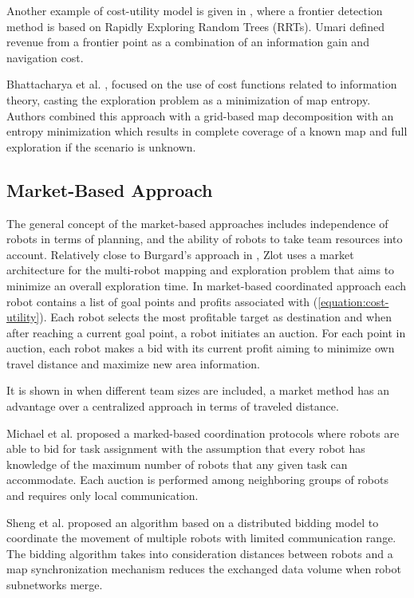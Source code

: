 Another example of cost-utility model is given in \cite{Umari2017}, where a frontier detection method is based on Rapidly Exploring Random Trees (RRTs). Umari defined revenue from a frontier point as a combination of an information gain and navigation cost.
 
Bhattacharya et al. \cite{Bhattacharya2013}, \cite{BhattacharyaGhrist2013} focused on the use of cost functions related to information theory, casting the exploration problem as a minimization of map entropy. Authors combined this approach with a grid-based map decomposition with an entropy minimization which results in complete coverage of a known map and full exploration if the scenario is unknown. 

\subsection{Market-Based Approach}

The general concept of the market-based approaches includes independence of robots in terms of planning, and the ability of robots to take team resources into account.
Relatively close to Burgard's approach in \cite{Burgard2000}, Zlot \cite{Zlot2002} uses a market architecture for the multi-robot mapping and exploration problem that aims to minimize an overall exploration time. In market-based coordinated approach each robot contains a list of goal points and profits associated with (\ref{equation:cost-utility}). Each robot selects the most profitable target as destination and when after reaching a current goal point, a robot initiates an auction. For each point in auction, each robot makes a bid with its current profit aiming to minimize own travel distance and maximize new area information.

It is shown in \cite{Dias2003} when different team sizes are included, a market method has an advantage over a centralized approach in terms of traveled distance. 

Michael et al. \cite{Michael2008} proposed a marked-based coordination protocols where robots are able to bid for task assignment with the assumption that every robot has knowledge of the maximum number of robots that any given task can accommodate. Each auction is performed among neighboring groups of robots and requires only local communication.

Sheng et al. \cite{Sheng2006} proposed an algorithm based on a distributed bidding model to coordinate the movement of multiple robots with limited communication range. The bidding algorithm takes into consideration distances between robots and a map synchronization mechanism reduces the exchanged data volume when robot subnetworks merge.

